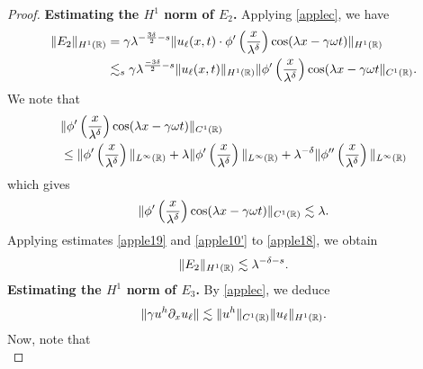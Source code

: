 \begin{proof}
{\bf Estimating the $H^1$ norm of $\hyperref[all_errors_together]{E_2}$.} Applying  \eqref{applec}, we have
\begin{equation}
	\begin{split}
		\|E_2\|_{H^1(\mathbb{R})} 
		& = \gamma \lambda^{-\frac{3 \delta}{2} -s } \|u_\ell(x,t) \cdot
		\phi'\left( \frac{x}{\lambda^\delta} \right) \cos (\lambda x - \gamma \omega t)
		\|_{H^1(\mathbb{R})}
		\\
		& \lesssim_{s} \gamma \lambda^{\frac{-3 \delta}{2} -s } \|u_\ell(x,t) \|_{H^1(\mathbb{R})}
		\|\phi'\left( \frac{x}{\lambda^\delta} \right )
		\cos(\lambda x - \gamma \omega t 
		\|_{C^1(\mathbb{R})}.
		\label{apple18} 
	\end{split}
\end{equation}
We note that
\begin{equation*}
	\begin{split}
		& \|\phi'\left( \frac{x}{\lambda^\delta} \right) \cos(\lambda x - \gamma \omega t)
		\|_{C^1(\mathbb{R})}
		\\
		& \le \|\phi' \left( \frac{x}{\lambda^\delta} \right)\|_{L^\infty(\mathbb{R})} +
		\lambda \|\phi'\left( \frac{x}{\lambda^\delta} \right)\|_{L^\infty(\mathbb{R})}
		+ \lambda^{-\delta} \|\phi''\left( \frac{x}{\lambda^\delta} \right)
		\|_{L^\infty(\mathbb{R})}
	\end{split}
\end{equation*}
which gives
\begin{equation}
	\begin{split}
		\|\phi'\left( \frac{x}{\lambda^\delta} \right) \cos(\lambda x - \gamma \omega t)
		\|_{C^1(\mathbb{R})} \lesssim \lambda.
		\label{apple19}
	\end{split}
\end{equation}
Applying estimates \eqref{apple19} and \eqref{apple10'} to \eqref{apple18}, we obtain
\begin{equation*}
	\begin{split}
	\label{apple20}
	\|E_2\|_{H^1(\mathbb{R})} \lesssim \lambda^{-\delta -s }.
\end{split}
\end{equation*}
%
%
%
%
{\bf Estimating the $H^1$ norm of $\hyperref[all_errors_together]{E_3}$.} 
By  \eqref{applec}, we deduce
\begin{equation}
	\begin{split}
		\|\gamma u^h \partial_x u_\ell \| \lesssim \|u^h\|_{C^1(\mathbb{R})}
		\|u_\ell\|_{H^1(\mathbb{R})}.
		\label{apple21}
	\end{split}
\end{equation}
Now, note that
\begin{equation}

\end{equation}
\end{proof}
